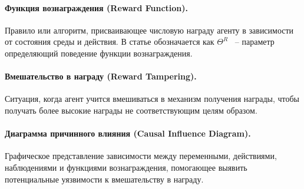 \paragraph{Функция вознаграждения (Reward Function).} Правило или алгоритм, присваивающее числовую награду агенту в зависимости от состояния среды и действия. В статье обозначается как $\Theta^R$ ~-- параметр определяющий поведение функции вознаграждения.

\paragraph{Вмешательство в награду (Reward Tampering).} Ситуация, когда агент учится вмешиваться в механизм получения награды, чтобы получать более высокие награды не соответствующим целям образом.

\paragraph{Диаграмма причинного влияния (Causal Influence Diagram).} Графическое представление зависимости между переменными, действиями, наблюдениями и функциями вознаграждения, помогающее выявить потенциальные уязвимости к вмешательству в награду.
